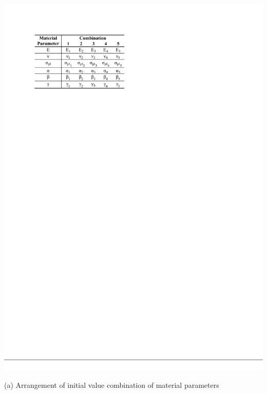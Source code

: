 \begin{table}[H]
    \centering
    \begin{minipage}[T!]{1.0\textwidth}
        \centering
        \begin{minipage}[T!][5.3cm][T!]{0.43\textwidth}
            \includegraphics[width=1.0\textwidth]{initalValueComb.pdf}
            \vfill{}
            \caption*{(a) Arrangement of initial value combination of material parameters}
            \label{tab:initialValueComb}
        \end{minipage}
        \hspace{0.05\textwidth} %
        \begin{minipage}[T!][5.3cm][T!]{0.43\textwidth}

\end{minipage}
\end{minipage}
\end{table}
